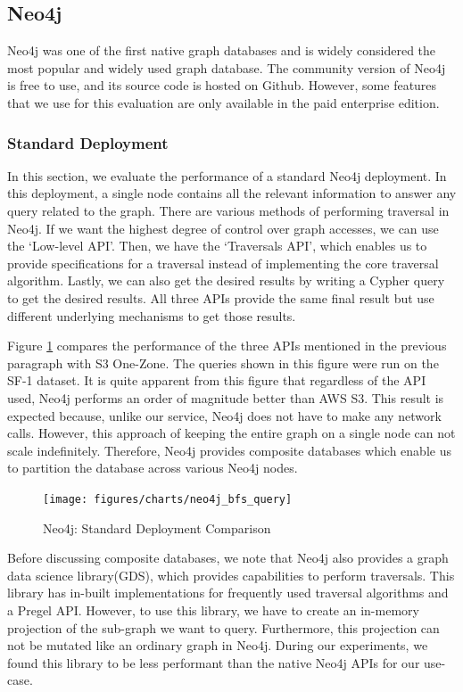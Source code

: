 \subsection{Neo4j}\label{sec:neo4jCmp}
Neo4j\cite{neo4j} was one of the first native graph databases and is widely
considered the most popular and widely used graph database. The community
version of Neo4j is free to use, and its source code is hosted on Github.
However, some features that we use for this evaluation are only
available in the paid enterprise edition.

\subsubsection{Standard Deployment}
In this section, we evaluate the performance of a standard Neo4j deployment.
In this deployment, a single node contains all the relevant information to
answer any query related to the graph. There are various methods of performing
traversal in Neo4j. If we want the highest degree of control over graph
accesses, we can use the `Low-level API'. Then, we have the `Traversals API', which
enables us to provide specifications for a traversal instead of implementing the
core traversal algorithm. Lastly, we can also get the desired results by writing
a Cypher query to get the desired results. All three APIs provide the same final
result but use different underlying mechanisms to get those results.

\smallskip
Figure \ref{fig:neoStandardCmp} compares the performance of the three APIs
mentioned in the previous paragraph with S3 One-Zone. The queries shown in this
figure were run on the SF-1 dataset. It is quite apparent from this figure that
regardless of the API used, Neo4j performs an order of magnitude better than
AWS S3. This result is expected because, unlike our service, Neo4j does not have 
to make any network calls. However, this approach of keeping the entire graph on
a single node can not scale indefinitely. Therefore, Neo4j provides composite
databases which enable us to partition the database across various Neo4j nodes. 
\begin{figure}[ht]
    \centering
    \texttt{[image: figures/charts/neo4j\_bfs\_query]}
    \caption{Neo4j: Standard Deployment Comparison}
    \label{fig:neoStandardCmp}
\end{figure}

\smallskip
Before discussing composite databases, we note that Neo4j also provides a
graph data science library(GDS), which provides capabilities to perform traversals.
This library has in-built implementations for frequently used traversal algorithms and a
Pregel API. However, to use this library, we have to create an
in-memory projection of the sub-graph we want to query. Furthermore, this
projection can not be mutated like an ordinary graph in Neo4j. During our
experiments, we found this library to be less performant than the native Neo4j
APIs for our use-case.

